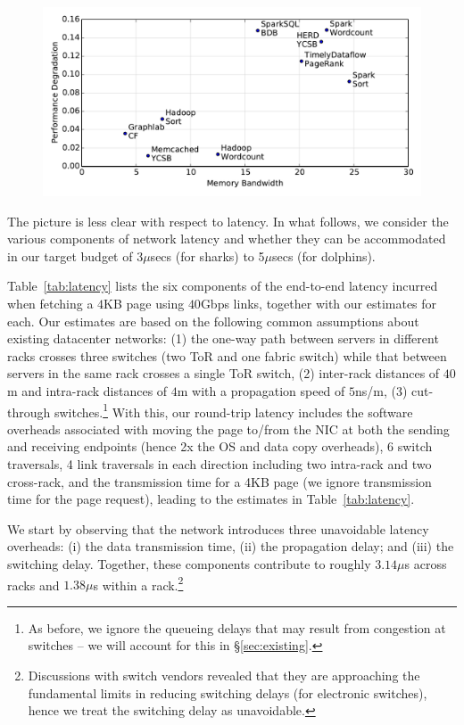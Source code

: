 \begin{figure}
  \centering
    \includegraphics[width=\columnwidth]{img/mem_bandwidth.pdf} 
    \caption{\small{}}
  \label{fig:memband}
\end{figure}

 The picture is less clear with respect to latency. In what follows, we consider the various components of network latency and whether they can be accommodated in our target budget of 3$\mu$secs (for sharks) to 5$\mu$secs (for dolphins).

Table~\ref{tab:latency} lists the six components of the end-to-end latency incurred when fetching  a $4$KB page using $40$Gbps links, together with our estimates for each. Our estimates are based on the following common assumptions about existing datacenter networks: (1) the one-way path between servers in different racks crosses three switches (two ToR and one fabric switch) while that between servers in the same rack crosses a single ToR switch, (2) inter-rack distances of $40$m and intra-rack distances of $4$m with a propagation speed of $5$ns/m, (3) cut-through switches.\footnote{As before, we ignore the queueing delays that may result from congestion at switches -- we will account for this in \S\ref{sec:existing}.}  
With this, our round-trip latency includes the software overheads associated with moving the page to/from the NIC at both the sending and receiving endpoints (hence 2x the OS and data copy overheads), 6 switch traversals, 4 link traversals in each direction including two intra-rack and two cross-rack, and the transmission time for a 4KB page (we ignore transmission time for the page request), leading to the estimates in Table~\ref{tab:latency}. 

We start by observing that the network introduces three unavoidable latency overheads: (i) the data transmission time, (ii) the propagation delay; and (iii) the switching delay. 
Together, these components contribute to roughly $3.14\mu$s across racks and $1.38\mu$s within a rack.\footnote{Discussions with switch vendors revealed that they are approaching the fundamental limits in reducing switching delays (for electronic switches), hence we treat the switching delay as unavoidable.} 

